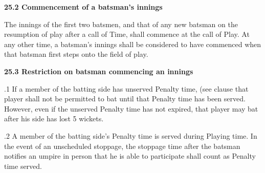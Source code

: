 \documentclass[12pt]{article}
\begin{document}
\vspace{\baselineskip}
{\fontsize{11pt}{13.2pt}\selectfont \textbf{25.2 \tabto{0.47in} Commencement of a batsman’s innings}\par}\par


\vspace{\baselineskip}
\begin{adjustwidth}{0.0in}{0.03in}
{\fontsize{9pt}{10.8pt}\selectfont The innings of the first two batsmen, and that of any new batsman on the resumption of play after a call of Time, shall commence at the call of Play. At any other time, a batsman’s innings shall be considered to have commenced when that batsman first steps onto the field of play.\par}\par

\end{adjustwidth}


\vspace{\baselineskip}
{\fontsize{11pt}{13.2pt}\selectfont \textbf{25.3 \tabto{0.47in} Restriction on batsman commencing an innings}\par}\par


\vspace{\baselineskip}
\begin{adjustwidth}{0.5in}{0.01in}
{\fontsize{9pt}{10.8pt}.1 \tabto{0.49in} If a member of the batting side has unserved Penalty time, (see clause that player shall not be permitted to bat until that Penalty time has been served. However, even if the unserved Penalty time has not expired, that player may bat after his side has lost 5 wickets.\par}\par

\end{adjustwidth}


\vspace{\baselineskip}
\begin{adjustwidth}{0.5in}{0.18in}
{\fontsize{9pt}{10.8pt}.2 \tabto{0.49in} A member of the batting side’s Penalty time is served during Playing time. In the event of an unscheduled stoppage, the stoppage time after the batsman notifies an umpire in person that he is able to participate shall count as Penalty time served.\par}\par

\end{adjustwidth}
\end{document}
